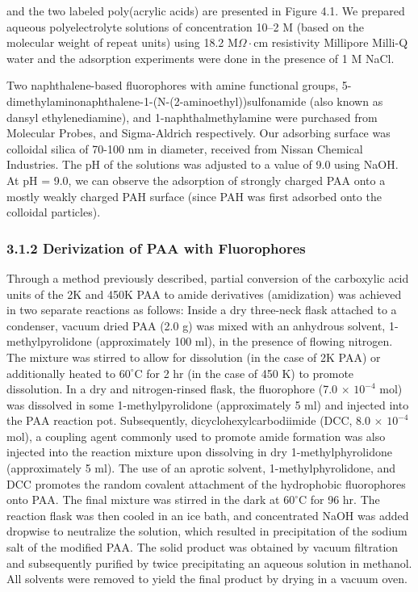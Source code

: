 \documentclass[journal=mamobx,manuscript=article]{achemso}
\begin{document}
and the two labeled poly(acrylic acids) are presented in Figure 4.1.  We prepared aqueous polyelectrolyte solutions of concentration 10–2 M (based on the molecular weight of repeat units) using 18.2 M$\Omega\cdot$cm resistivity Millipore Milli-Q water and the adsorption experiments were done in the presence of 1 M NaCl.  

Two naphthalene-based fluorophores with amine functional groups, 5-dimethylaminonaphthalene-1-(N-(2-aminoethyl))sulfonamide (also known as dansyl ethylenediamine), and 1-naphthalmethylamine were purchased from Molecular Probes, and Sigma-Aldrich respectively.  Our adsorbing surface was colloidal silica of 70-100 nm in diameter, received from Nissan Chemical Industries. The pH of the solutions was adjusted to a value of 9.0 using NaOH.  At pH = 9.0, we can observe the adsorption of strongly charged PAA onto a mostly weakly charged PAH surface (since PAH was first adsorbed onto the colloidal particles).

\subsubsection{3.1.2 Derivization of PAA with Fluorophores}

Through a method previously described, \cite{weber1954fluorescent,Anghel1998} partial conversion of the carboxylic acid units of the 2K and 450K PAA to amide derivatives (amidization) was achieved in two separate reactions as follows:  Inside a dry three-neck flask attached to a condenser, vacuum dried PAA (2.0 g) was mixed with an anhydrous solvent, 1-methylpyrolidone (approximately 100 ml), in the presence of flowing nitrogen.  The mixture was stirred to allow for dissolution (in the case of 2K PAA) or additionally heated to $60^{\circ}$C for 2 hr (in the case of 450 K) to promote dissolution.  In a dry and nitrogen-rinsed flask, the fluorophore (7.0 $\times$ $10^{-4}$ mol) was dissolved in some 1-methylpyrolidone (approximately 5 ml) and injected into the PAA reaction pot.  Subsequently, dicyclohexylcarbodiimide (DCC, 8.0 $\times$ $10^{-4}$ mol), a coupling agent commonly used to promote amide formation was also injected into the reaction mixture upon dissolving in dry 1-methylphyrolidone (approximately 5 ml).  The use of an aprotic solvent, 1-methylphyrolidone, and DCC promotes the random covalent attachment of the hydrophobic fluorophores onto PAA.\cite{Anghel1998}  The final mixture was stirred in the dark at $60^{\circ}$C for 96 hr.  The reaction flask was then cooled in an ice bath, and concentrated NaOH was added dropwise to neutralize the solution, which resulted in precipitation of the sodium salt of the modified PAA.  The solid product was obtained by vacuum filtration and subsequently purified by twice precipitating an aqueous solution in methanol.  All solvents were removed to yield the final product by drying in a vacuum oven.
\end{document}
